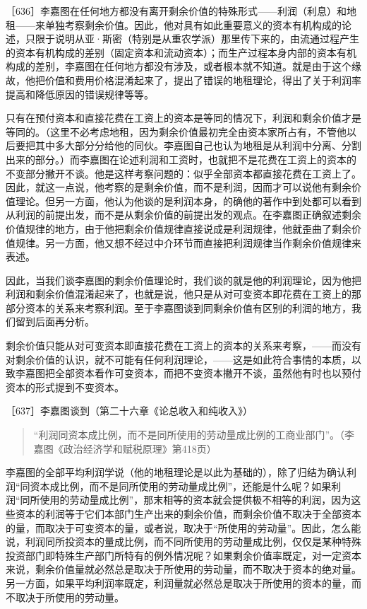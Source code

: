 


［636］李嘉图在任何地方都没有离开剩余价值的特殊形式——利润（利息）和地租——来单独考察剩余价值。因此，他对具有如此重要意义的资本有机构成的论述，只限于说明从亚·斯密（特别是从重农学派）那里传下来的，由流通过程产生的资本有机构成的差别（固定资本和流动资本）；而生产过程本身内部的资本有机构成的差别，李嘉图在任何地方都没有涉及，或者根本就不知道。就是由于这个缘故，他把价值和费用价格混淆起来了，提出了错误的地租理论，得出了关于利润率提高和降低原因的错误规律等等。

只有在预付资本和直接花费在工资上的资本是等同的情况下，利润和剩余价值才是等同的。（这里不必考虑地租，因为剩余价值最初完全由资本家所占有，不管他以后要把其中多大部分分给他的同伙。李嘉图自己也认为地租是从利润中分离、分割出来的部分。）而李嘉图在论述利润和工资时，也就把不是花费在工资上的资本的不变部分撇开不谈。他是这样考察问题的：似乎全部资本都直接花费在工资上了。因此，就这一点说，他考察的是剩余价值，而不是利润，因而才可以说他有剩余价值理论。但另一方面，他认为他谈的是利润本身，的确他的著作中到处都可以看到从利润的前提出发，而不是从剩余价值的前提出发的观点。在李嘉图正确叙述剩余价值规律的地方，由于他把剩余价值规律直接说成是利润规律，他就歪曲了剩余价值规律。另一方面，他又想不经过中介环节而直接把利润规律当作剩余价值规律来表述。

因此，当我们谈李嘉图的剩余价值理论时，我们谈的就是他的利润理论，因为他把利润和剩余价值混淆起来了，也就是说，他只是从对可变资本即花费在工资上的那部分资本的关系来考察利润。至于李嘉图谈到同剩余价值有区别的利润的地方，我们留到后面再分析。

剩余价值只能从对可变资本即直接花费在工资上的资本的关系来考察，——而没有对剩余价值的认识，就不可能有任何利润理论，——这是如此符合事情的本质，以致李嘉图把全部资本看作可变资本，而把不变资本撇开不谈，虽然他有时也以预付资本的形式提到不变资本。

［637］李嘉图谈到（第二十六章《论总收入和纯收入》）

\begin{quote}{“利润同资本成比例，而不是同所使用的劳动量成比例的工商业部门”。（李嘉图《政治经济学和赋税原理》第418页）}\end{quote}

李嘉图的全部平均利润学说（他的地租理论是以此为基础的），除了归结为确认利润“同资本成比例，而不是同所使用的劳动量成比例”，还能是什么呢？如果利润“同所使用的劳动量成比例”，那末相等的资本就会提供极不相等的利润，因为这些资本的利润等于它们本部门生产出来的剩余价值，而剩余价值不取决于全部资本的量，而取决于可变资本的量，或者说，取决于“所使用的劳动量”。因此，怎么能说，利润同所投资本的量成比例，而不同所使用的劳动量成比例，仅仅是某种特殊投资部门即特殊生产部门所特有的例外情况呢？如果剩余价值率既定，对一定资本来说，剩余价值量就必然总是取决于所使用的劳动量，而不取决于资本的绝对量。另一方面，如果平均利润率既定，利润量就必然总是取决于所使用的资本的量，而不取决于所使用的劳动量。

